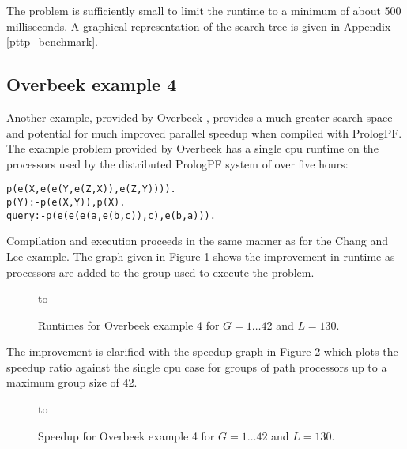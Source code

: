 The problem is sufficiently small to limit the runtime to a minimum of about 500
milliseconds.  A graphical representation of the search tree is given in 
Appendix \ref{pttp_benchmark}.

\subsection{Overbeek example 4}
\enlargethispage{\baselineskip}  %

Another example, provided by Overbeek \cite{DLO87}, provides a much
greater search space and potential for much improved parallel speedup when compiled
with PrologPF.
The example problem provided by Overbeek has a single cpu runtime on the
processors used by the distributed PrologPF system of over five hours: \vspace{2mm}\\
\begin{minipage}[h]{\textwidth}  %
\begin{alltt}
p(e(X,e(e(Y,e(Z,X)),e(Z,Y)))).
p(Y) :- p(e(X,Y)), p(X).
query :- p(e(e(e(a,e(b,c)),c),e(b,a))).
\end{alltt}
\end{minipage}  %

Compilation and execution proceeds in the same manner as for the Chang and Lee
example.
The graph given in Figure \ref{pttp_overbeek_L_130_runtime} shows the improvement in
runtime as processors are added to the group used to execute the problem.

\begin{figure}[htb]
\vspace{5mm} \hbox to 
\caption{Runtimes for Overbeek example 4 for $G=1\ldots 42$ and $L=130$.}
\vspace{5mm}
\label{pttp_overbeek_L_130_runtime}
\end{figure}

The improvement is clarified with the speedup graph in
Figure \ref{pttp_overbeek_L_130_spdup} which plots the speedup ratio against the
single cpu case for groups of path processors up to a maximum group size of 42.

\begin{figure}[htb]
\vspace{5mm} \hbox to 
\caption{Speedup for Overbeek example 4 for $G=1\ldots 42$ and $L=130$.}
\vspace{5mm}
\label{pttp_overbeek_L_130_spdup}
\end{figure}

